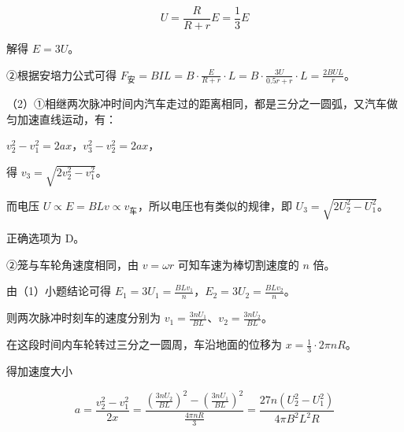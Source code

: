 \documentclass[\gkver]{gaokaozhenti}
\begin{document}
\begin{enumerate}
{\[U=\frac{R}{R+r}E=\frac{1}{3}E\]

解得 $E=3U$。

②根据安培力公式可得 $F_{\text{安}}=BIL=B\cdot\frac{E}{R+r}\cdot L=B\cdot\frac{3U}{0.5r+r}\cdot L=\frac{2BUL}{r}$。

（2）①相继两次脉冲时间内汽车走过的距离相同，都是三分之一圆弧，又汽车做匀加速直线运动，有：

$v_{2}^{2}-v_{1}^{2}=2ax$，$v_{3}^{2}-v_{2}^{2}=2ax$，

得 $v_{3}=\sqrt{2v_{2}^{2}-v_{1}^{2}}$。

而电压 $U\propto E=BLv\propto v_{\text{车}}$，所以电压也有类似的规律，即 $U_{3}=\sqrt{2U_{2}^{2}-U_{1}^{2}}$。

正确选项为 D。

②笼与车轮角速度相同，由 $v=\omega r$ 可知车速为棒切割速度的 $n$ 倍。

由（1）小题结论可得 $E_{1}=3U_{1}=\frac{BLv_{1}}{n}$，$E_{2}=3U_{2}=\frac{BLv_{2}}{n}$。

则两次脉冲时刻车的速度分别为 $v_{1}=\frac{3nU_{1}}{BL}$、$v_{2}=\frac{3nU_{2}}{BL}$。

在这段时间内车轮转过三分之一圆周，车沿地面的位移为 $x=\frac{1}{3}\cdot2\pi nR$。

得加速度大小

\[a=\frac{v_{2}^{2}-v_{1}^{2}}{2x}=\frac{\left(\frac{3nU_{2}}{BL}\right)^{2}-\left(\frac{3nU_{1}}{BL}\right)^{2}}{\frac{4\pi nR}{3}}=\frac{27n(U_{2}^{2}-U_{1}^{2})}{4\pi B^{2}L^{2}R}\]
}

\end{enumerate}
\end{document}
